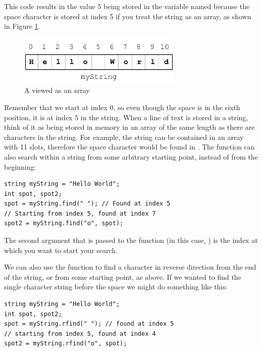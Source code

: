 This code results in the value 5 being stored in the variable named  because the space character is stored at index 5 if you treat the string as an array, as shown in Figure \ref{fig:string-diagram}.

\begin{figure}[t]
  \centering
  \includegraphics[width=0.7\textwidth]{diagrams/string-diagram.pdf}
  \caption{A  viewed as an array} \label{fig:string-diagram} 
\end{figure}

Remember that we start at index 0, so even though the space is in the sixth position, it is at index 5 in the string.
When a line of text is stored in a string, think of it as being stored in memory in an array of the same length as there are characters in the string.
For example, the string  can be contained in an array with 11 slots, therefore the space character would be found in .
The  function can also search within a string from some arbitrary starting point, instead of from the beginning:

\noindent\begin{minipage}{\linewidth}\begin{lstlisting}
string myString = "Hello World";
int spot, spot2;
spot = myString.find(" "); // Found at index 5
// Starting from index 5, found at index 7
spot2 = myString.find("o", spot); 
\end{lstlisting}\end{minipage}

\noindent The second argument that is passed to the function (in this case, ) is the index at which you want to start your search.

We can also use the  function to find a character in reverse direction from the end of the string, or from some starting point, as above.
If we wanted to find the single character string  before the space we might do something like this:

\noindent\begin{minipage}{\linewidth}\begin{lstlisting}
string myString = "Hello World";
int spot, spot2;
spot = myString.rfind(" "); // found at index 5
// starting from index 5, found at index 4
spot2 = myString.rfind("o", spot); 
\end{lstlisting}\end{minipage}

